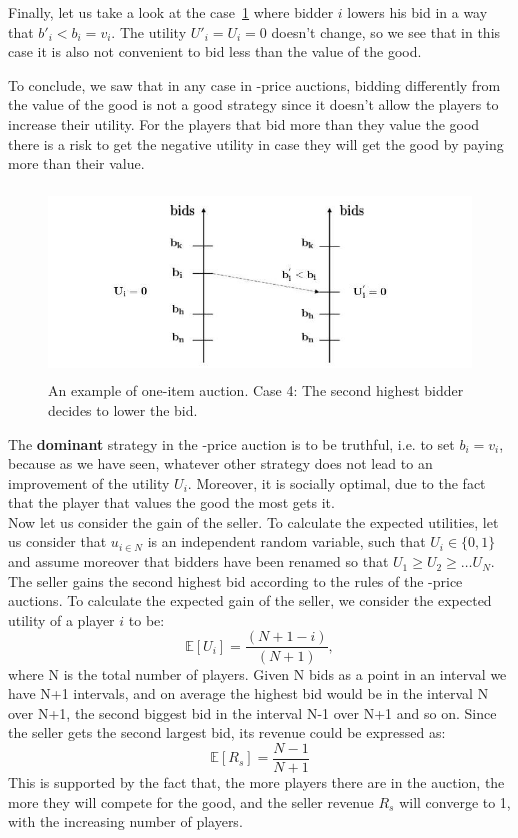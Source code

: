 \documentclass{article}
\begin{document}
Finally, let us take a look at the case~\ref{fig:bids4} where  bidder $i$ lowers his bid in a way that $b'_i<b_i=v_i$. The utility $U'_i=U_i=0$ doesn't change, so we see that in this case it is also not convenient to bid less than the value of the good.

To conclude, we saw that in any case in -price auctions, bidding differently from the value of the good is not a good strategy since it doesn't allow the players to increase their utility. For the players that bid more than they value the good there is a risk to get the negative utility in case they will get the good by paying more than their value. 
\begin{figure}
	[!hbt] 
	\begin{center}
		\includegraphics[height=5cm]{img10.jpg} \caption{An example of one-item auction. Case 4: The second highest bidder decides to lower the bid.} \label{fig:bids4} 
	\end{center}
\end{figure}

The \textbf{dominant} strategy in the -price auction is to be truthful, i.e. to set $b_i = v_i$, because as we have seen, whatever other strategy does not lead to an improvement of the utility $U_i$. Moreover, it is socially optimal, due to the fact that the player that values the good the most gets it.\\
Now let us consider the gain of the seller. To calculate the expected utilities, let us consider that $u_{i \in N}$ is an independent random variable, such that $U_i \in \{0,1\}$ and assume moreover that bidders have been renamed so that $U_1 \ge U_2 \ge \dots U_N$. The seller gains the second highest bid according to the rules of the -price auctions. To calculate the expected gain of the seller, we consider the expected utility of a player $i$ to be: 
\begin{equation}
	\mathbb{E}[U_i] = \frac{(N + 1 - i)}{(N + 1)}, 
\end{equation}
where N is the total number of players. Given N bids as a point in an interval we have N+1 intervals, and on average the highest bid would be in the interval N over N+1, the second biggest bid in the interval N-1 over N+1 and so on. Since the seller gets the second largest bid, its revenue could be expressed as: 
\begin{equation}
	\mathbb{E}[R_s] = \frac{N-1}{N+1} 
\end{equation}
This is supported by the fact that, the more players there are in the auction, the more they will compete for the good, and the seller revenue $R_s$ will converge to 1, with the increasing number of players.
\end{document}

